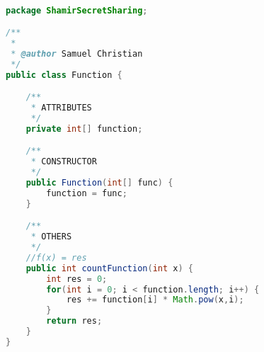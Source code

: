 \begin{lstlisting}[language=Java,basicstyle=\tiny,caption=Function.java]

package ShamirSecretSharing;

/**
 *
 * @author Samuel Christian
 */
public class Function {

    /**
     * ATTRIBUTES
     */
    private int[] function;

    /**
     * CONSTRUCTOR
     */
    public Function(int[] func) {
        function = func;
    }

    /**
     * OTHERS
     */
    //f(x) = res
    public int countFunction(int x) {
        int res = 0;
        for(int i = 0; i < function.length; i++) {
            res += function[i] * Math.pow(x,i);
        }
        return res;
    }
}

\end{lstlisting}

